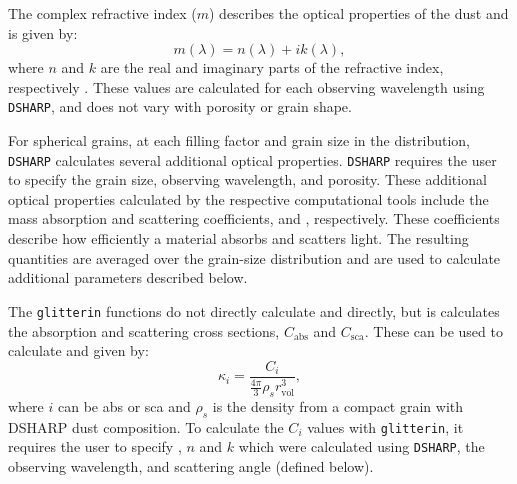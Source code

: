 

The complex refractive index ($m$) describes the optical properties of the dust and is given by:
\begin{equation}
 m(\lambda) = n(\lambda) + ik(\lambda),
\end{equation}
\noindent where $n$ and $k$ are the real and imaginary parts of the refractive index, respectively \citep{Zhang2023}. These values are calculated for each observing wavelength using \texttt{DSHARP}, and does not vary with porosity or grain shape. 


For spherical grains, at each filling factor and grain size in the distribution, \texttt{DSHARP} calculates several additional optical properties. \texttt{DSHARP} requires the user to specify the grain size, observing wavelength, and porosity. These additional optical properties calculated by the respective computational tools include the mass absorption and scattering coefficients, \kabs and \kscaNS, respectively. These coefficients describe how efficiently a material absorbs and scatters light. The resulting quantities are averaged over the grain-size distribution and are used to calculate additional parameters described below. 


The \texttt{glitterin} functions do not directly calculate \kabs and \ksca directly, but is calculates the absorption and scattering cross sections, $C_\text{abs}$ and $C_\text{sca}$. These can be used to calculate \kabs and \ksca given by:
\begin{equation}
    \kappa_i = \frac{C_i}{\frac{4\pi}{3}\rho_s r_\text{vol}^3},
\end{equation}
\noindent where $i$ can be abs or sca and $\rho_s$ is the density from a compact grain with DSHARP dust composition. To calculate the $C_i$ values with \texttt{glitterin}, it requires the user to specify \xvolNS, $n$ and $k$ which were calculated using \texttt{DSHARP}, the observing wavelength, and scattering angle (defined below). 











